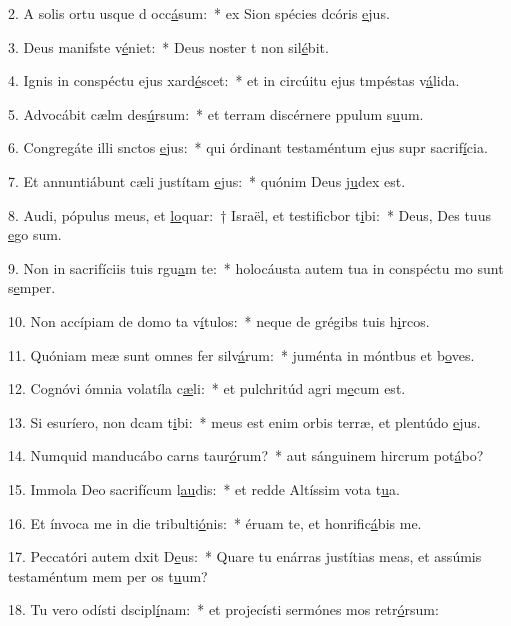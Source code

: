 2. A solis ortu usque d occ\uline{á}sum:~* ex Sion spécies dcóris \uline{e}jus.\par 
3. Deus manifste v\uline{é}niet:~* Deus noster t non sil\uline{é}bit.\par 
4. Ignis in conspéctu ejus xard\uline{é}scet:~* et in circúitu ejus tmpéstas v\uline{á}lida.\par 
5. Advocábit cælm des\uline{ú}rsum:~* et terram discérnere ppulum s\uline{u}um.\par 
6. Congregáte illi snctos \uline{e}jus:~* qui órdinant testaméntum ejus supr sacrif\uline{í}cia.\par 
7. Et annuntiábunt cæli justítam \uline{e}jus:~* quónim Deus j\uline{u}dex est.\par 
8. Audi, pópulus meus, et \uline{lo}quar:~† Israël, et testificbor t\uline{i}bi:~* Deus, Des tuus \uline{e}go sum.\par 
9. Non in sacrifíciis tuis rgu\uline{a}m te:~* holocáusta autem tua in conspéctu mo sunt s\uline{e}mper.\par 
10. Non accípiam de domo ta v\uline{í}tulos:~* neque de grégibs tuis h\uline{i}rcos.\par 
11. Quóniam meæ sunt omnes fer silv\uline{á}rum:~* juménta in móntbus et b\uline{o}ves.\par 
12. Cognóvi ómnia volatíla c\uline{æ}li:~* et pulchritúd agri m\uline{e}cum est.\par 
13. Si esuríero, non dcam t\uline{i}bi:~* meus est enim orbis terræ, et plentúdo \uline{e}jus.\par 
14. Numquid manducábo carns taur\uline{ó}rum?~* aut sánguinem hircrum pot\uline{á}bo?\par 
15. Immola Deo sacrifícum l\uline{au}dis:~* et redde Altíssim vota t\uline{u}a.\par 
16. Et ínvoca me in die tribulti\uline{ó}nis:~* éruam te, et honrific\uline{á}bis me.\par 
17. Peccatóri autem dxit D\uline{e}us:~* Quare tu enárras justítias meas, et assúmis testaméntum mem per os t\uline{u}um?\par 
18. Tu vero odísti dscipl\uline{í}nam:~* et projecísti sermónes mos retr\uline{ó}rsum:\par 

